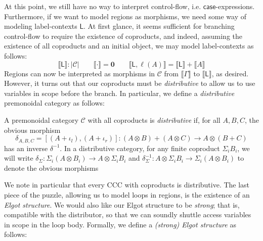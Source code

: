 \documentclass[acmsmall,screen,review]{acmart}
\newcommand{\mc}[1]{\ensuremath{\mathcal{#1}}}
\newcommand{\mb}[1]{\ensuremath{\mathbf{#1}}}
\newcommand{\ms}[1]{\ensuremath{\mathsf{#1}}}
\newcommand{\lhyp}[2]{#1(#2)}
\newcommand{\dnt}[1]{\llbracket{#1}\rrbracket}
\begin{document}
At this point, we still have no way to interpret control-flow, i.e. $\ms{case}$-expressions.
Furthermore, if we want to model regions as morphisms, we need some way of modeling label-contexts
$\ms{L}$. At first glance, it seems sufficient for branching control-flow to require the existence
of coproducts, and indeed, assuming the existence of all coproducts and an initial object, we may
model label-contexts as follows:
$$
\boxed{\dnt{\ms{L}} : |\mc{C}|} \qquad 
  \dnt{\cdot} = \mb{0} \qquad \dnt{\ms{L}, \lhyp{\ell}{A}} = \dnt{\ms{L}} + \dnt{A}
$$
Regions can now be interpreted as morphisms in $\mc{C}$ from $\dnt{\Gamma}$ to $\dnt{\ms{L}}$, as
desired. However, it turns out that our coproducts must be \emph{distributive} to allow us to use
variables in scope before the branch. In particular, we define a \emph{distributive} premonoidal
category as follows:
\begin{definition}
  A premonoidal category $\mc{C}$ with all coproducts is \emph{distributive} if, for all $A, B, C$,
  the obvious morphism
  $$
  \delta_{A, B, C} 
    = [(A + \iota_l), (A + \iota_r)] : (A \otimes B) + (A \otimes C) \to A \otimes (B + C)
  $$
  has an inverse $\delta^{-1}$. In a distributive category, for any finite coproduct $\Sigma_iB_i$,
  we will write $\delta_{\Sigma} : \Sigma_i (A \otimes B_i) \to A \otimes \Sigma_i B_i$ and
  $\delta_{\Sigma}^{-1} : A \otimes \Sigma_i B_i \to \Sigma_i (A \otimes B_i)$ to denote the obvious
  morphisms
\end{definition}
We note in particular that every CCC with coproducts is distributive.
The last piece of the puzzle, allowing us to model loops in regions, is the existence of an
\emph{Elgot structure}. We would also like our Elgot structure to be \emph{strong}; that is,
compatible with the distributor, so that we can soundly shuttle access variables in scope in the
loop body. Formally, we define a \emph{(strong) Elgot structure} as follows:
\end{document}
